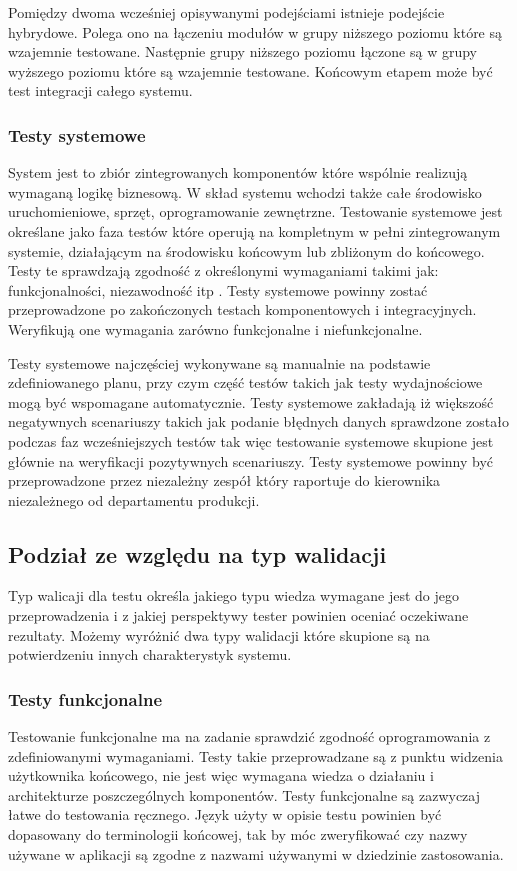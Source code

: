 Pomiędzy dwoma wcześniej opisywanymi podejściami istnieje podejście hybrydowe. Polega ono na łączeniu modułów w grupy niższego poziomu które są wzajemnie testowane. Następnie grupy niższego poziomu łączone są w grupy wyższego poziomu które są wzajemnie testowane. Końcowym etapem może być test integracji całego systemu.

\subsubsection{Testy systemowe}
System jest to zbiór zintegrowanych komponentów które wspólnie realizują wymaganą logikę biznesową. W skład systemu wchodzi także całe środowisko uruchomieniowe, sprzęt, oprogramowanie zewnętrzne. Testowanie systemowe jest określane jako faza testów które operują na kompletnym w pełni zintegrowanym systemie, działającym na środowisku końcowym lub zbliżonym do końcowego. Testy te sprawdzają zgodność z określonymi wymaganiami takimi jak: funkcjonalności, niezawodność itp
.
Testy systemowe powinny zostać przeprowadzone po  zakończonych testach  komponentowych i integracyjnych.  Weryfikują one wymagania zarówno funkcjonalne i niefunkcjonalne.

Testy systemowe najczęściej wykonywane są manualnie na podstawie zdefiniowanego planu, przy czym część testów takich jak testy wydajnościowe mogą być wspomagane automatycznie.
Testy systemowe zakładają iż większość negatywnych scenariuszy takich jak podanie błędnych danych sprawdzone zostało podczas faz wcześniejszych testów tak więc testowanie systemowe skupione jest głównie na weryfikacji pozytywnych scenariuszy. 
Testy systemowe powinny być przeprowadzone przez niezależny zespół który raportuje do kierownika niezależnego od departamentu produkcji. 



\subsection{Podział ze względu na typ walidacji}
Typ walicaji dla testu określa jakiego typu wiedza wymagane jest do jego przeprowadzenia i z jakiej perspektywy tester powinien oceniać oczekiwane rezultaty. Możemy wyróżnić dwa typy walidacji które skupione są na potwierdzeniu innych charakterystyk systemu.
\subsubsection{Testy funkcjonalne}
Testowanie funkcjonalne ma na zadanie sprawdzić zgodność oprogramowania z zdefiniowanymi wymaganiami. Testy takie przeprowadzane są z punktu widzenia użytkownika końcowego, nie jest więc wymagana wiedza o działaniu i architekturze poszczególnych komponentów. Testy funkcjonalne są  zazwyczaj łatwe do testowania ręcznego. Język użyty w opisie testu powinien być dopasowany do terminologii końcowej, tak by móc zweryfikować czy nazwy używane w aplikacji są zgodne z nazwami używanymi w dziedzinie zastosowania.

